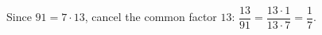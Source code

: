 Since $91=7\cdot13$, cancel the common factor $13$: $\dfrac{13}{91}=\dfrac{13\cdot1}{13\cdot7}=\boxed{\dfrac17}$.
